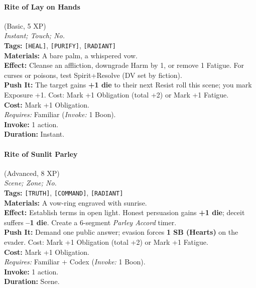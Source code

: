 \paragraph{Rite of Lay on Hands} (Basic, 5 XP) \hfill \\
\emph{Instant; Touch; No.} \\
\textbf{Tags:} \texttt{[HEAL]}, \texttt{[PURIFY]}, \texttt{[RADIANT]} \\
\textbf{Materials:} A bare palm, a whispered vow. \\
\textbf{Effect:} Cleanse an affliction, downgrade Harm by 1, or remove 1 Fatigue. For curses or poisons, test Spirit+Resolve (DV set by fiction). \\
\textbf{Push It:} The target gains \textbf{+1 die} to their next Resist roll this scene; you mark Exposure +1. Cost: Mark +1 Obligation (total +2) or Mark +1 Fatigue. \\
\textbf{Cost:} Mark +1 Obligation. \\
\textit{Requires:} Familiar (\textit{Invoke:} 1 Boon). \\
\textbf{Invoke:} 1 action. \\
\textbf{Duration:} Instant.

\paragraph{Rite of Sunlit Parley} (Advanced, 8 XP) \hfill \\
\emph{Scene; Zone; No.} \\
\textbf{Tags:} \texttt{[TRUTH]}, \texttt{[COMMAND]}, \texttt{[RADIANT]} \\
\textbf{Materials:} A vow-ring engraved with sunrise. \\
\textbf{Effect:} Establish terms in open light. Honest persuasion gains \textbf{+1 die}; deceit suffers \textbf{--1 die}. Create a 6-segment \textit{Parley Accord} timer. \\
\textbf{Push It:} Demand one public answer; evasion forces \textbf{1 SB (Hearts)} on the evader. Cost: Mark +1 Obligation (total +2) or Mark +1 Fatigue. \\
\textbf{Cost:} Mark +1 Obligation. \\
\textit{Requires:} Familiar + Codex (\textit{Invoke:} 1 Boon). \\
\textbf{Invoke:} 1 action. \\
\textbf{Duration:} Scene.

